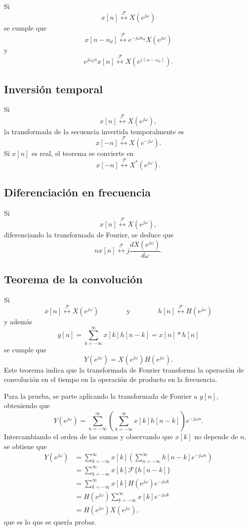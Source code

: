 \documentclass[a4paper]{report}
\begin{document}
Si 
\[
 x[n]\overset{\mathcal{F}}{\longleftrightarrow}X(e^{j\omega})
\]
se cumple que
\[
 x[n-n_d]\overset{\mathcal{F}}{\longleftrightarrow}e^{-j\omega n_d}X(e^{j\omega})
\]
y
\[
 e^{j\omega_0n}x[n]\overset{\mathcal{F}}{\longleftrightarrow}X(e^{j(\omega-\omega_0)}).
\]

\subsection{Inversión temporal}

Si 
\[
 x[n]\overset{\mathcal{F}}{\longleftrightarrow}X(e^{j\omega}),
\]
la transformada de la secuencia invertida temporalmente es
\[
 x[-n]\overset{\mathcal{F}}{\longleftrightarrow}X(e^{-j\omega}).
\]
Si \(x[n]\) es real, el teorema se convierte en
\[
 x[-n]\overset{\mathcal{F}}{\longleftrightarrow}X^*(e^{j\omega}).
\]

\subsection{Diferenciación en frecuencia}

Si 
\[
x[n]\overset{\mathcal{F}}{\longleftrightarrow}X(e^{j\omega}),
\] 
diferenciando la transformada de Fourier, se deduce que
\[
 nx[n]\overset{\mathcal{F}}{\longleftrightarrow}j\frac{dX(e^{j\omega})}{d\omega}.
\]

\subsection{Teorema de la convolución}\label{sec:seq_and_sys_convolution_theorem}

Si
\[
 x[n]\overset{\mathcal{F}}{\longleftrightarrow}X(e^{j\omega})
  \qquad\qquad\textrm{y}\qquad\qquad 
 h[n]\overset{\mathcal{F}}{\longleftrightarrow}H(e^{j\omega})
\]
y además
\[
 y[n]=\sum_{k=-\infty}^{\infty}x[k]h[n-k]=x[n]*h[n]
\]
se cumple que
\[
 Y(e^{j\omega})=X(e^{j\omega})H(e^{j\omega}).
\]
Este teorema indica que la transformada de Fourier transforma la operación de convolución en el tiempo en la operación de producto en la frecuencia.

Para la prueba, se parte aplicando la transformada de Fourier a \(y[n]\), obteniendo que
\[
 Y(e^{j\omega})=\sum_{n=-\infty}^{\infty}\left(\sum_{k=-\infty}^{\infty}x[k]h[n-k]\right)e^{-j\omega n}.
\]
Intercambiando el orden de las sumas y observando que \(x[k]\) no depende de \(n\), se obtiene que
\begin{align*}
 Y(e^{j\omega})&=\sum_{k=-\infty}^{\infty}x[k]\left(\sum_{n=-\infty}^{\infty}h[n-k]e^{-j\omega n}\right)\\
  &=\sum_{k=-\infty}^{\infty}x[k]\mathcal{F}\{h[n-k]\}\\
  &=\sum_{k=-\infty}^{\infty}x[k]H(e^{j\omega})e^{-j\omega k}\\
  &=H(e^{j\omega})\sum_{k=-\infty}^{\infty}x[k]e^{-j\omega k}\\
  &=H(e^{j\omega})X(e^{j\omega}),
\end{align*}
que es lo que se quería probar.
	   
\end{document}
